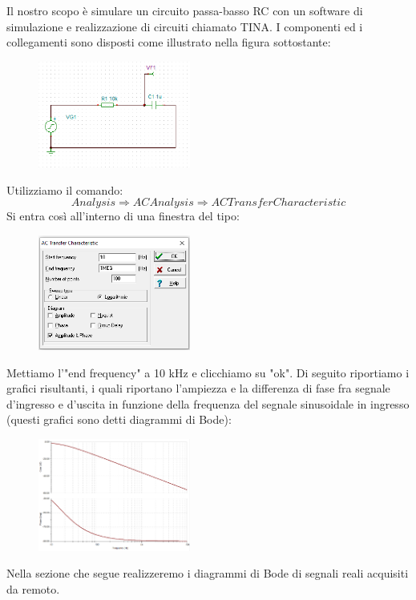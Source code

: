 

Il nostro scopo è simulare un circuito passa-basso RC con un software di simulazione e realizzazione di circuiti chiamato TINA. I componenti ed i collegamenti sono disposti come illustrato nella figura sottostante:
\begin{figure}[H]
\caption{}
    \includegraphics[width=5cm]{settimana_2/immagini/FiltroPassaBasso.png}
    \centering
\end{figure}
Utilizziamo il comando:
\begin{equation}
    Analysis \Rightarrow AC Analysis \Rightarrow AC Transfer Characteristic
\end{equation}
Si entra così all'interno di una finestra del tipo:
\begin{figure}[H]
\caption{}
    \includegraphics[width=5cm]{settimana_2/immagini/ACtransfer.png}
    \centering
\end{figure}
Mettiamo l'"end frequency" a 10 kHz e clicchiamo su "ok". Di seguito riportiamo i grafici risultanti, i quali riportano l'ampiezza e la differenza di fase fra segnale d'ingresso e d'uscita in funzione della frequenza del segnale sinusoidale in ingresso (questi grafici sono detti diagrammi di Bode):
\begin{figure}[H]
\caption{}
    \includegraphics[width=5cm]{settimana_2/immagini/Bode.png}
    \centering
\end{figure}
Nella sezione che segue realizzeremo i diagrammi di Bode di segnali reali acquisiti da remoto.

